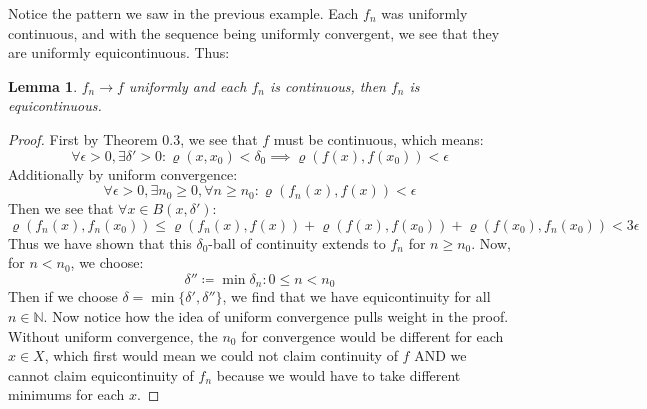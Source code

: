 \documentclass[10pt,letterpaper]{article} %
\newtheorem{lem}{Lemma}[section]
\begin{document}
Notice the pattern we saw in the previous example. Each $f_n$ was uniformly continuous, and with the sequence being uniformly convergent, we see that they are uniformly equicontinuous. Thus:
\begin{lem}
$f_n \xrightarrow{} f$ uniformly and each $f_n$ is continuous, then $f_n$ is equicontinuous. 
\end{lem}
\begin{proof}
First by Theorem 0.3, we see that $f$ must be continuous, which means:
\begin{equation*}
  \forall \epsilon > 0, \exists \delta' > 0: \varrho(x, x_0) < \delta_0 \implies \varrho(f(x), f(x_0)) < \epsilon
\end{equation*}
Additionally by uniform convergence:
\begin{equation*}
  \forall \epsilon > 0, \exists n_0 \geqslant 0, \forall n \geqslant n_0: \varrho(f_n(x), f(x)) < \epsilon
\end{equation*}
Then we see that $\forall x \in B(x, \delta')$:
\begin{equation*}
  \varrho(f_n(x), f_n(x_0)) \leqslant \varrho(f_n(x), f(x)) + \varrho(f(x), f(x_0))  + \varrho(f(x_0), f_n(x_0)) < 3\epsilon
\end{equation*}
Thus we have shown that this $\delta_0$-ball of continuity extends to $f_n$ for $n \geqslant n_0$. Now, for $n < n_0$, we choose:
\begin{equation*}
  \delta'' \coloneq \min{\delta_n: 0 \leqslant n < n_0}
\end{equation*}
Then if we choose $\delta = \min\{\delta', \delta''\}$, we find that we have equicontinuity for all $n \in \mathbb{N}$. Now notice how the idea of uniform convergence pulls weight in the proof.\\

Without uniform convergence, the $n_0$ for convergence would be different for each $x \in X$, which first would mean we could not claim continuity of $f$ AND we cannot claim equicontinuity of $f_n$ because we would have to take different minimums for each $x$.
\end{proof}
\end{document}
